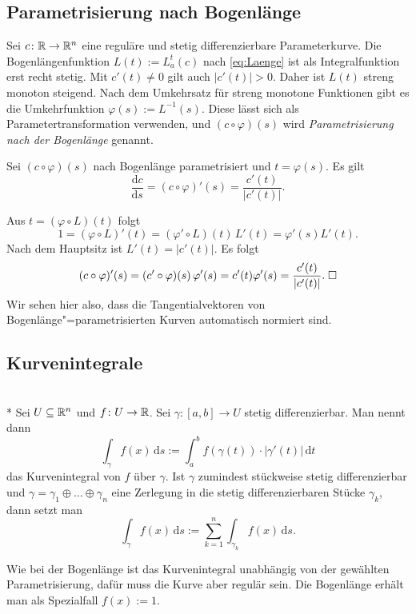 \subsection{Parametrisierung nach Bogenlänge}

Sei $c\colon\mathbb R\to\mathbb R^n$ eine reguläre und stetig differenzierbare
Parameterkurve. Die Bogenlängenfunktion $L(t):=L_a^t(c)$ nach
\eqref{eq:Laenge} ist als Integralfunktion erst recht stetig.
Mit $c'(t)\ne 0$ gilt auch $|c'(t)|>0$. Daher ist $L(t)$ streng monoton
steigend. Nach dem Umkehrsatz für streng monotone Funktionen gibt es
die Umkehrfunktion $\varphi(s):=L^{-1}(s)$. Diese lässt sich als
Parametertransformation verwenden, und $(c\circ\varphi)(s)$ wird
\emph{Parametrisierung nach der Bogenlänge} genannt.

\begin{corollary}
Sei $(c\circ\varphi)(s)$ nach Bogenlänge parametrisiert
und $t=\varphi(s)$. Es gilt
\begin{equation}
\frac{\mathrm dc}{\mathrm ds} =
(c\circ\varphi)'(s) = \frac{c'(t)}{|c'(t)|}.
\end{equation}
\end{corollary}
\noindent{}
Aus $t=(\varphi\circ L)(t)$ folgt
\begin{equation}
1 = (\varphi\circ L)'(t) = (\varphi'\circ L)(t)\,L'(t) = \varphi'(s)L'(t).
\end{equation}
Nach dem Hauptsitz ist $L'(t)=|c'(t)|$. Es folgt
\begin{equation}
(c\circ\varphi)'(s) = (c'\circ\varphi)(s)\,\varphi'(s) = c'(t)\varphi'(s)
= \frac{c'(t)}{|c'(t)|}.\;\Box
\end{equation}
Wir sehen hier also, dass die Tangentialvektoren von
Bogenlänge"=parametrisierten Kurven automatisch normiert sind.

\subsection{Kurvenintegrale}
\begin{definition}\mbox{}\\*
Sei $U\subseteq\mathbb R^n$ und $f\colon U\to\mathbb R$.
Sei $\gamma\colon [a,b]\to U$ stetig differenzierbar. Man nennt dann%
\[\int_\gamma f(x)\,\mathrm ds := \int_a^b f(\gamma(t))\cdot |\gamma'(t)|\,\mathrm dt\]
das Kurvenintegral von $f$ über $\gamma$.
Ist $\gamma$ zumindest stückweise stetig differenzierbar und
$\gamma = \gamma_1\oplus\ldots\oplus\gamma_n$ eine Zerlegung
in die stetig differenzierbaren Stücke $\gamma_k$, dann setzt man%
\[\int_\gamma f(x)\,\mathrm ds := \sum_{k=1}^n \int_{\gamma_k} f(x)\,\mathrm ds.\]
\end{definition}
Wie bei der Bogenlänge ist das Kurvenintegral unabhängig von
der gewählten Parametrisierung, dafür muss die Kurve aber regulär sein.
Die Bogenlänge erhält man als Spezialfall $f(x):=1$.

